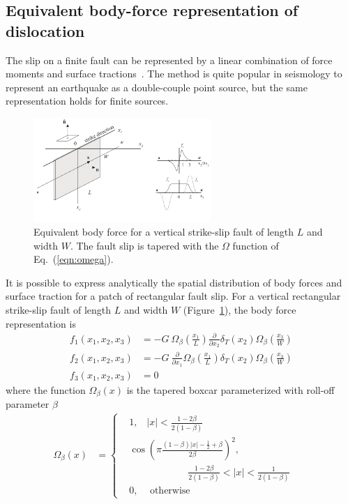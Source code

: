 \documentclass[10pt]{article}
\begin{document}
\subsection{Equivalent body-force representation of dislocation}

The slip on a finite fault can be represented by a linear combination of force moments and surface tractions~\citep{aki&richards80a}. The method is quite popular in seismology to represent an earthquake as a double-couple point source, but the same representation holds for finite sources.
%
\begin{figure}[h]
\centering
\includegraphics[width=0.6\textwidth]{geometry_finite_fault}
\caption{\small Equivalent body force for a vertical strike-slip fault of length $L$ and width $W$. The fault slip is tapered with the $\Omega$ function of Eq.~(\ref{eqn:omega}).}
\label{fig:geometry_finite_fault}
\end{figure}
%
It is possible to express analytically the spatial distribution of body forces and surface traction for a patch of rectangular fault slip. For a vertical rectangular strike-slip fault of length $L$ and width $W$ (Figure~\ref{fig:geometry_finite_fault}), the body force representation is
\begin{equation}\label{eqn:body-force}
\begin{aligned}
f_1(x_1,x_2,x_3)&=-G~ \Omega_\beta\!\left(\frac{x_1}{L}\right)\frac{\partial}{\partial x_2}\delta_T\!\left(x_2\right)\Omega_\beta\!\left(\frac{x_3}{W}\right)\\
f_2(x_1,x_2,x_3)&=-G~ \frac{\partial}{\partial x_1}\Omega_\beta\!\left(\frac{x_1}{L}\right)\delta_T\!\left(x_2\right)\Omega_\beta\!\left(\frac{x_3}{W}\right)\\
f_3(x_1,x_2,x_3)&=0
\end{aligned}
\end{equation}
where the function $\Omega_\beta(x)$ is the tapered boxcar parameterized with roll-off parameter $\beta$
\begin{equation}\label{eqn:omega}
\begin{aligned}
\Omega_{\beta}(x)&=%
\left\{\begin{aligned}%
&1\text{,}\quad|x|<\frac{1-2\beta}{2(1-\beta)}\\
&\cos\left(\pi\frac{(1-\beta)|x|-\frac{1}{2}+\beta}{2\beta}\right)^2
\text{,}\\
& \qquad\qquad\qquad\frac{1-2\beta}{2(1-\beta)}<|x|<\frac{1}{2(1-\beta)}& &\\
&0\text{,}\quad\text{ otherwise}%
\end{aligned}\right.
\end{aligned}
\end{equation}
\end{document}
